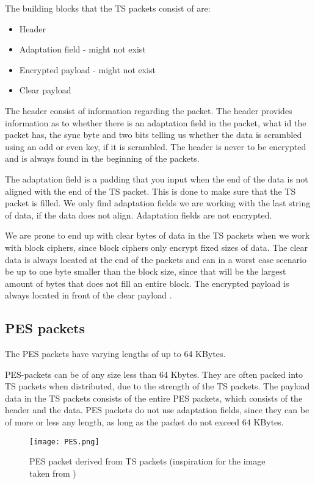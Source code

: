The building blocks that the TS packets consist of are:

\begin{itemize}
\item Header
\item Adaptation field - might not exist
\item Encrypted payload - might not exist
\item Clear payload
\end{itemize}

The header consist of information regarding the packet. The header provides 
information as to whether there is an adaptation field in the packet, what id 
the packet has, the sync byte and two bits telling us whether the data is 
scrambled using an odd or even key, if it is scrambled. The header is never to 
be encrypted and is always found in the beginning of the packets.

The adaptation field is a padding that you input when the end of the data is not 
aligned with the end of the TS packet. This is done to make sure that the TS 
packet is filled. We only find adaptation fields we are working with the last 
string of data, if the data does not align. Adaptation fields are not encrypted.

We are prone to end up with clear bytes of data in the TS packets when we work 
with block ciphers, since block ciphers only encrypt fixed sizes of data. The 
clear data is always located at the end of the packets and can in a worst case 
scenario be up to one byte smaller than the block size, since that will be the 
largest amount of bytes that does not fill an entire block. The encrypted 
payload is always located in front of the clear payload 
\cite[pp. 10--11]{DVB:2013}.

\subsection{PES packets}
The PES packets have varying lengths of up to 64 KBytes.

PES-packets can be of any size less than 64 Kbytes. They are often packed into 
TS packets when distributed, due to the strength of the TS packets. The payload
data in the TS packets consists of the entire PES packets, which consists of the 
header and the data. PES packets do not use adaptation fields, since they can be 
of more or less any length, as long as the packet do not exceed 64 KBytes.

\begin{figure}
  \texttt{[image: PES.png]}
  \label{img:PES}
  \caption{PES packet derived from TS packets (inspiration for the image 
taken from \citep[p. 9]{ETR:289} ) }
\end{figure}

